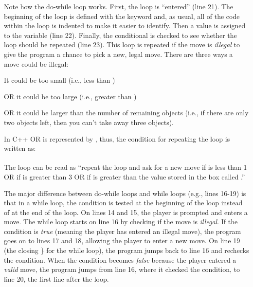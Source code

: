 Note how the do-while loop works.  First, the loop is ``entered'' (line 21).  The beginning of the loop is defined with the keyword  and, as usual, all of the code within the loop is indented to make it easier to identify.  Then a value is assigned to the variable  (line 22).  Finally, the conditional is checked to see whether the loop should be repeated (line 23).  
This loop is repeated if the move is \emph{illegal} to give the program a chance to pick a new, legal move.  There are three ways a move could be illegal:
\begin{tight_enumerate}
\item  It could be too small (i.e., less than )
\item OR  it could be too large (i.e., greater than )
\item OR it could be larger than the number of remaining objects (i.e., if there are only two objects left, then you can't take away three objects).
\end{tight_enumerate}
In C++ OR is represented by \cf{||}, thus, the condition for repeating the loop is written as: \\
\\
The loop can be read as ``repeat the loop and ask for a new move if  is less than 1 OR if   is greater than 3 OR if   is greater than the value stored in the box called .''  

The major difference between do-while loops and while loops (e.g., lines 16-19) is that in a while loop, the condition is tested at the beginning of the loop instead of at the end of the loop.  On lines 14 and 15, the player is prompted and enters a move. The while loop starts on line 16 by checking if the move is \emph{illegal}.  If the condition is \emph{true} (meaning the player has entered an illegal move), the program goes on to lines 17 and 18, allowing the player to enter a new move.  On line 19 (the closing \} for the while loop), the program jumps back to line 16 and rechecks the condition.  When the condition becomes \emph{false} because the player entered a \emph{valid} move, the program jumps from line 16, where it checked the condition, to line 20, the first line after the loop.  

